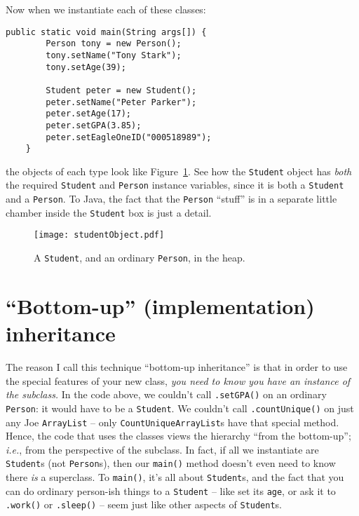 \begin{samepage}
Now when we instantiate each of these classes:

\begin{Verbatim}[fontsize=\footnotesize,samepage=true,frame=single]
    public static void main(String args[]) {
        Person tony = new Person();
        tony.setName("Tony Stark");
        tony.setAge(39);

        Student peter = new Student();
        peter.setName("Peter Parker");
        peter.setAge(17);
        peter.setGPA(3.85);
        peter.setEagleOneID("000518989");
    }
\end{Verbatim}
\end{samepage}

the objects of each type look like Figure~\ref{fig:studentObject}. See how the
\texttt{Student} object has \textit{both} the required \texttt{Student} and
\texttt{Person} instance variables, since it is both a \texttt{Student} and a
\texttt{Person}. To Java, the fact that the \texttt{Person} ``stuff'' is in a
separate little chamber inside the \texttt{Student} box is just a detail.

\begin{figure}
\centering
\texttt{[image: studentObject.pdf]}
\caption{A \texttt{Student}, and an ordinary \texttt{Person}, in the heap.}
\label{fig:studentObject}
\end{figure}

\section{``Bottom-up'' (implementation) inheritance}
The reason I call this technique ``bottom-up inheritance'' is that in order to
use the special features of your new class, \textit{you need to know you have
an instance of the subclass.} In the code above, we couldn't call
\texttt{.setGPA()} on an ordinary \texttt{Person}: it would have to be a
\texttt{Student}. We couldn't call \texttt{.countUnique()} on just any Joe
\texttt{ArrayList} -- only \texttt{CountUniqueArrayList}s have that special
method. Hence, the code that uses the classes views the hierarchy ``from the
bottom-up''; \textit{i.e.}, from the perspective of the subclass. In fact, if
all we instantiate are \texttt{Student}s (not \texttt{Person}s), then our
\texttt{main()} method doesn't even need to know there \textit{is} a
superclass. To \texttt{main()}, it's all about \texttt{Student}s, and the fact
that you can do ordinary person-ish things to a \texttt{Student} -- like set
its \texttt{age}, or ask it to \texttt{.work()} or \texttt{.sleep()} -- seem
just like other aspects of \texttt{Student}s.

